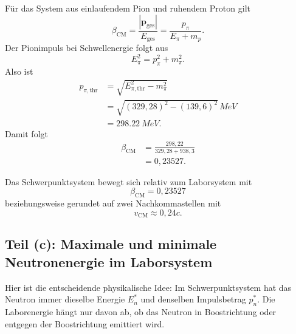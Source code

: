 \documentclass[11pt,a4paper]{scrartcl}
\newcommand{\abs}[1]{\left| #1 \right|}
\newcommand{\vect}[1]{\bm{#1}}
\newcommand{\MeV}{\si{MeV}}
\newcommand{\betacm}{\beta_{\mathrm{CM}}}
\theoremstyle{definition}
\theoremstyle{plain}
\theoremstyle{remark}
\begin{document}
\begin{calculationbox}
F\"ur das System aus einlaufendem Pion und ruhendem Proton gilt
\[
    \betacm
    =\frac{\abs{\vect{p}_{\mathrm{ges}}}}{E_{\mathrm{ges}}}
    =\frac{p_\pi}{E_\pi+m_p}.
\]
Der Pionimpuls bei Schwellenergie folgt aus
\[
    E_\pi^2=p_\pi^2+m_\pi^2.
\]
Also ist
\begin{align*}
    p_{\pi,\mathrm{thr}}
    &=\sqrt{E_{\pi,\mathrm{thr}}^2-m_\pi^2} \\
    &=\sqrt{(329,28)^2-(139,6)^2}\,\MeV \\
    &=\SI{298,22}{MeV}.
\end{align*}
Damit folgt
\begin{align*}
    \betacm
    &=\frac{298,22}{329,28+938,3} \\
    &=0,23527.
\end{align*}
\end{calculationbox}

\begin{answerbox}
Das Schwerpunktsystem bewegt sich relativ zum Laborsystem mit
\[
    \boxed{\betacm=0,23527}
\]
beziehungsweise gerundet auf zwei Nachkommastellen mit
\[
    \boxed{v_{\mathrm{CM}}\approx 0,24c}.
\]
\end{answerbox}

\subsection{Teil (c): Maximale und minimale Neutronenergie im Laborsystem}

\begin{presentationbox}
Hier ist die entscheidende physikalische Idee: Im Schwerpunktsystem hat das Neutron immer dieselbe Energie $E_n^\ast$ und denselben Impulsbetrag $p_n^\ast$. Die Laborenergie h\"angt nur davon ab, ob das Neutron in Boostrichtung oder entgegen der Boostrichtung emittiert wird.
\end{presentationbox}
\end{document}
